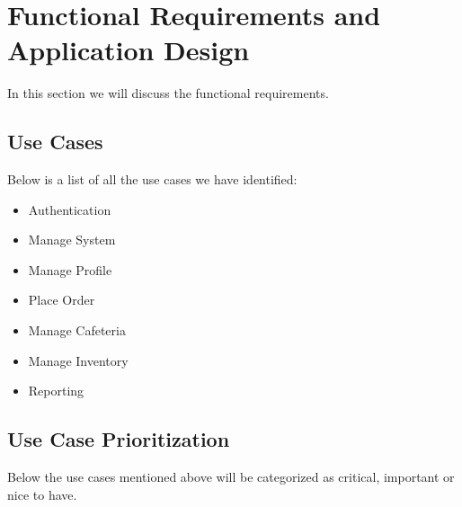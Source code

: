 \documentclass[a4paper,12pt]{report}
\begin{document}
\section{Functional Requirements and Application Design}
In this section we will discuss the functional requirements. \\

\subsection{Use Cases }
Below is a list of all the use cases we have identified:

\begin{itemize}

\item Authentication
\item Manage System
\item Manage Profile
\item Place Order
\item Manage Cafeteria
\item Manage Inventory 
\item Reporting

\end{itemize}


\subsection{Use Case Prioritization}
Below the use cases mentioned above will be categorized as critical, important or nice to have.
\end{document}
